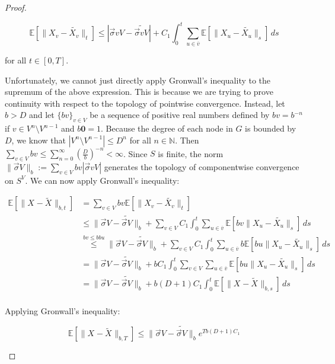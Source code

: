 \documentclass[12pt]{article}
\newcommand{\mb}{\mathbb}
\newcommand{\ov}{\overline}
\newcommand{\os}{\overset}
\newcommand{\ind}{\hspace{24pt}}
\newcommand{\ex}[1]{\mb{E}\left[#1\right]}			%
\renewcommand{\root}{\mathbf{0}}				%
\renewcommand{\v}{v}							%
\newcommand{\vv}{u}								%
\renewcommand{\S}{S}							%
\newcommand{\s}{\sigma}							%
\newcommand{\sv}{\vec{\s}}						%
\renewcommand{\b}{b}							%
\newcommand{\T}{T}								%
\renewcommand{\t}{t}							%
\renewcommand{\tt}{s}							%
\newcommand{\cl}{\ov}							%
\newcommand{\degr}{D}								%
\newcommand{\pup}[1]{^{#1}}							%
\renewcommand{\G}{G}								%
\newcommand{\V}{V}									%
\newcommand{\numb}{n}								%
\newcommand{\XState}[1]{\S^{#1}}				%
\newcommand{\rxvts}[2]{X_{#1}{#2}}					%
\newcommand{\const}[1]{C_{#1}}						%
\newcommand{\alt}{\widetilde}						%
\begin{document}
\begin{proof}
\begin{enumerate}[(a)]
\[\ex{\|\rxvts{\v}{} - \alt{\rxvts{\v}{}}\|_\t} \leq |\sv{\v}{\V} - \alt{\sv{\v}{\V}}| + \const{1}\int_0^\t \sum_{\vv\in \cl{\v}} \ex{\|\rxvts{\vv}{} - \alt{\rxvts{\vv}{}}\|_\tt}\,d\tt\]

for all \(\t \in [0,\T]\).

\ind Unfortunately, we cannot just directly apply Gronwall's inequality to the supremum of the above expression. This is because we are trying to prove continuity with respect to the topology of pointwise convergence. Instead, let \(\b{} > \degr\) and let \(\{\b{\v}\}_{\v \in \V}\) be a sequence of positive real numbers defined by \(\b{\v} = \b{}^{-\numb}\) if \(\v \in \V\pup{\numb}\setminus \V\pup{\numb-1}\) and \(\b{\root} = 1\). Because the degree of each node in \(\G\) is bounded by \(\degr\), we know that \(|\V\pup{\numb}\setminus \V\pup{\numb-1}| \leq \degr^{\numb}\) for all \(\numb\in \mb{N}\). Then \(\sum_{\v \in \V} \b{\v} \leq \sum_{\numb=0}^\infty \left(\frac{\degr}{\b{}}\right)^{-\numb} < \infty\). Since \(\S\) is finite, the norm \(\|\sv{}{\V}\|_{\b{}} := \sum_{\v \in \V} \b{\v}|\sv{\v}{\V}|\) generates the topology of componentwise convergence on \(\S^\V\). We can now apply Gronwall's inequality:

\begin{align*}
\ex{\|\rxvts{}{} - \alt{\rxvts{}{}}\|_{\b{},\t}} &= \sum_{\v \in \V} \b{\v}\ex{\|\rxvts{\v}{} - \alt{\rxvts{\v}{}}\|_\t}\\
&\leq \|\sv{}{\V} - \alt{\sv{}{\V}}\|_{\b{}} + \sum_{\v \in \V}\const{1}\int_0^\t \sum_{\vv \in \cl{\v}} \ex{\b{\v}\|\rxvts{\vv}{} - \alt{\rxvts{\vv}{}}\|_\tt}\,d\tt\\
&\os{\b{\v}\leq \b{}\b{\vv}}{\leq} \|\sv{}{\V} - \alt{\sv{}{\V}}\|_{\b{}} + \sum_{\v \in \V}\const{1}\int_0^\t \sum_{\vv \in \cl{\v}} \b{}\ex{\b{\vv}\|\rxvts{\vv}{} - \alt{\rxvts{\vv}{}}\|_\tt}\,d\tt\\
&= \|\sv{}{\V} - \alt{\sv{}{\V}}\|_{\b{}} + \b{}\const{1}\int_0^\t \sum_{\v \in \V}\sum_{\vv \in \cl{\v}} \ex{\b{\vv}\|\rxvts{\vv}{} - \alt{\rxvts{\vv}{}}\|_\tt}\,d\tt\\
&=\|\sv{}{\V} - \alt{\sv{}{\V}}\|_{\b{}} + \b{}(\degr+1)\const{1}\int_0^\t \ex{\|\rxvts{}{} - \alt{\rxvts{}{}}\|_{\b{},\tt}}\,d\tt\\
\end{align*}

Applying Gronwall's inequality:

\[\ex{\|\rxvts{}{} - \alt{\rxvts{}{}}\|_{\b{},\T}} \leq \|\sv{}{\V} - \alt{\sv{}{\V}}\|_{\b{}}e^{\T\b{}(\degr+1)\const{1}}\]


\end{enumerate}
\end{proof}
\end{document}
